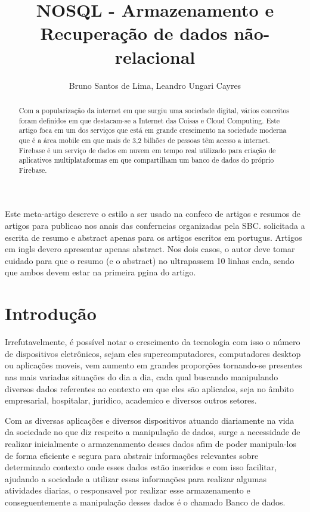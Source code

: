 \documentclass[12pt]{article}
\title{NOSQL - Armazenamento e Recuperação de dados não-relacional}
\author{Bruno Santos de Lima\inst{1}, Leandro Ungari Cayres\inst{1} }
\begin{document}
 

\maketitle

\begin{abstract}
  Com a popularização da internet em que surgiu uma sociedade digital, vários conceitos foram definidos em que destacam-se a Internet das Coisas e Cloud Computing. Este artigo foca em um dos serviços que está em grande crescimento na sociedade moderna que é a área mobile em que mais de 3,2 bilhões de pessoas têm acesso a internet. Firebase é um serviço de dados em nuvem em tempo real utilizado para criação de aplicativos multiplataformas em que compartilham um banco de dados do próprio Firebase.
\end{abstract}
     
\begin{resumo} 
  Este meta-artigo descreve o estilo a ser usado na confeco de artigos e
  resumos de artigos para publicao nos anais das conferncias organizadas
  pela SBC.  solicitada a escrita de resumo e abstract apenas para os artigos
  escritos em portugus. Artigos em ingls devero apresentar apenas abstract.
  Nos dois casos, o autor deve tomar cuidado para que o resumo (e o abstract)
  no ultrapassem 10 linhas cada, sendo que ambos devem estar na primeira
  pgina do artigo.
\end{resumo}


\section{Introdução}
\label{sec:intro}
Irrefutavelmente, é possível notar o crescimento da tecnologia com isso o número de dispositivos eletrônicos, sejam eles supercomputadores, computadores desktop ou aplicações moveis, vem aumento em grandes proporções tornando-se presentes nas mais variadas situações do dia a dia, cada qual buscando manipulando diversos dados referentes ao contexto em que eles são aplicados, seja no âmbito empresarial, hospitalar, juridico, academico e diversos outros setores.

Com as diversas aplicações e diversos dispositivos atuando diariamente na vida da sociedade no que diz respeito a manipulação de dados, surge a necessidade de realizar inicialmente o armazenamento desses dados afim de poder manipula-los de forma eficiente e segura para abstrair informações relevantes sobre determinado contexto onde esses dados estão inseridos e com isso facilitar, ajudando a sociedade a utilizar essas informações para realizar algumas atividades diarias, o responsavel por realizar esse armazenamento e conseguentemente a manipulação desses dados é o chamado Banco de dados.
\end{document}
